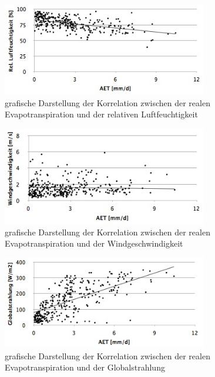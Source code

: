 \begin{appendix}
\begin{figure}[H]
\centering
\includegraphics[width=0.8\textwidth]{figures/korr_relfeuchte.jpg}
\caption{grafische Darstellung der Korrelation zwischen der realen Evapotranspiration und der relativen Luftfeuchtigkeit}
\label{fig:korr_relfeucht}
\end{figure}

\begin{figure}[H]
\centering
\includegraphics[width=0.8\textwidth]{figures/korr_windgeschw.jpg}
\caption{grafische Darstellung der Korrelation zwischen der realen Evapotranspiration und der Windgeschwindigkeit}
\label{fig:korr_wind}
\end{figure}

\begin{figure}[H]
\centering
\includegraphics[width=0.8\textwidth]{figures/korr_globalstrahlung.jpg}
\caption{grafische Darstellung der Korrelation zwischen der realen Evapotranspiration und der Globalstrahlung}
\label{fig:korr_globalstrahlung}
\end{figure}


\end{appendix}
